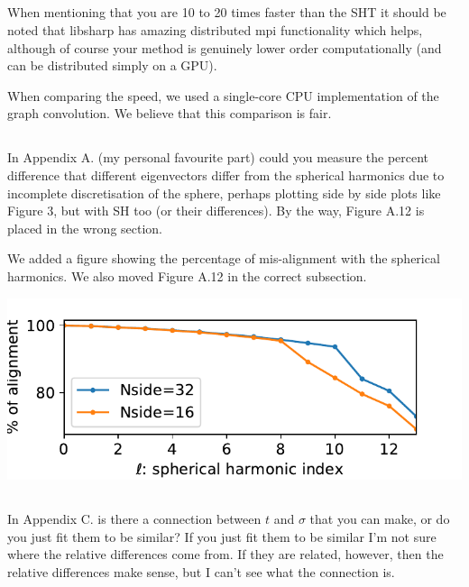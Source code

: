 \documentclass[12pt,a4paper]{article}
\newcommand{\nati}[1]{{\color[rgb]{.1,.6,.1}{NP: #1}}}
\newcommand{\todo}[1]{{\color[rgb]{.6,.1,.6}{TODO: #1}}}
\newcommand{\1}{\b{1}}              %
\newcommand{\0}{\b{0}}              %
\begin{document}
\subsection{}
\begin{mdframed}[style=comment]
When mentioning that you are 10 to 20 times faster than the SHT it should be noted that libsharp has amazing distributed mpi functionality which helps, although of course your method is genuinely lower order computationally (and can be distributed simply on a GPU).
\end{mdframed}
When comparing the speed, we used a single-core CPU implementation of the graph convolution. We believe that this comparison is fair.
\nati{Is this sufficient?}

\subsection{}
\begin{mdframed}[style=comment]
In Appendix A. (my personal favourite part) could you measure the percent difference that different eigenvectors differ from the spherical harmonics due to incomplete discretisation of the sphere, perhaps plotting side by side plots like Figure 3, but with SH too (or their differences). By the way, Figure A.12 is placed in the wrong section.
\end{mdframed}
\todo{Assigned: @nati, @michael}
We added a figure showing the percentage of mis-alignment with the spherical harmonics. We also moved Figure A.12 in the correct subsection.

\begin{center}
\includegraphics[width=0.5\linewidth]{figures/subspace_alignment_percentage.pdf}
\end{center}

\subsection{}
\begin{mdframed}[style=comment]
In Appendix C. is there a connection between $t$ and $\sigma$ that you can make, or do you just fit them to be similar? If you just fit them to be similar I'm not sure where the relative differences come from. If they are related, however, then the relative differences make sense, but I can't see what the connection is.
\end{mdframed}
\end{document}
